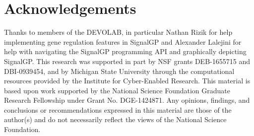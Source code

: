 \section{Acknowledgements}

Thanks to members of the DEVOLAB, in particular Nathan Rizik for help implementing gene regulation features in SignalGP and Alexander Lalejini for help with navigating the SignalGP programming API and graphically depicting SignalGP.
This research was supported in part by NSF grants DEB-1655715 and DBI-0939454, and by Michigan State University through the computational resources provided by the Institute for Cyber-Enabled Research.
This material is based upon work supported by the National Science Foundation Graduate Research Fellowship under Grant No. DGE-1424871.
Any opinions, findings, and conclusions or recommendations expressed in this material are those of the author(s) and do not necessarily reflect the views of the National Science Foundation.
